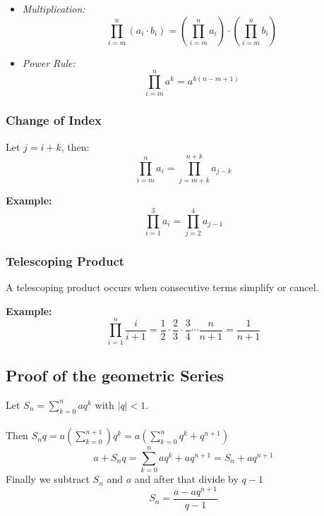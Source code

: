 \begin{itemize}[label=\(-\)]
    \item \emph{Multiplication:}
    \[
    \prod_{i = m}^{n} (a_i \cdot b_i) = \left( \prod_{i = m}^{n} a_i \right) \cdot \left( \prod_{i = m}^{n} b_i \right)
    \]
    \item \emph{Power Rule:}
    \[
    \prod_{i = m}^{n} a^k = a^{k(n - m + 1)}
    \]
\end{itemize}

\subsubsection{Change of Index}

Let \(j = i + k\), then:
\[
\prod_{i = m}^{n} a_i = \prod_{j = m + k}^{n + k} a_{j - k}
\]

\textbf{Example:}
\[
\prod_{i = 1}^{3} a_i = \prod_{j = 2}^{4} a_{j - 1}
\]

\subsubsection{Telescoping Product}

A telescoping product occurs when consecutive terms simplify or cancel.

\textbf{Example:}
\[
\prod_{i = 1}^{n} \frac{i}{i+1} = \frac{1}{2} \cdot \frac{2}{3} \cdot \frac{3}{4} \cdots \frac{n}{n+1} = \frac{1}{n+1}
\]


\subsection{Proof of the geometric Series}

Let \(S_n = \sum_{k = 0}^{n}aq^k\) with \(|q| < 1\).
\\\\
Then \(S_n q = a(\sum_{k = 0}^{n + 1})q^k = a\left( \sum_{k= 0}^{n} q^k + q^{n + 1}\right)\)
\[
a + S_nq = \sum_{k = 0}^{n}aq^k + aq^{n + 1}  = S_n + aq^{n + 1}
\]
Finally we subtract \(S_n\) and \(a\) and after that divide by \(q - 1\)
\[
S_n = \frac{a - aq^{n + 1}}{q - 1}
\]
\QED